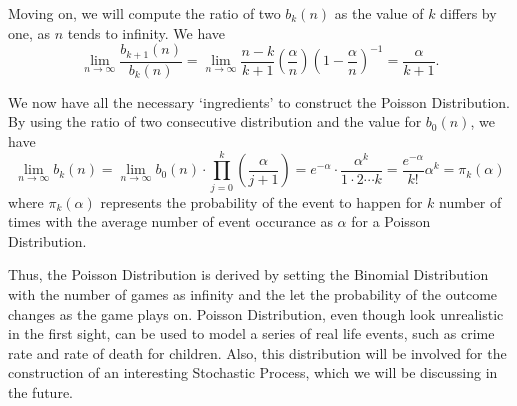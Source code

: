 \documentclass{article}
\theoremstyle{definition}
\begin{document}
\bigskip

\noindent Moving on, we will compute the ratio of two $b_k(n)$ as the value of $k$ differs by one, as $n$ tends to infinity. We have 
\[
\lim_{n \to \infty} \frac{b_{k+1}(n)}{b_{k}(n)} = \lim_{n \to \infty} \frac {n-k}{k+1} (\frac{\alpha}{n})(1-\frac{\alpha}{n})^{-1} = \frac{\alpha}{k+1}.
\]

\bigskip

\noindent We now have all the necessary `ingredients' to construct the Poisson Distribution. By using the ratio of two consecutive distribution and the value for $b_0(n)$, we have
\[
\lim_{n \to \infty} b_k(n) = \lim_{n \to \infty} b_0(n) \cdot \prod_{j=0}^{k}(\frac{\alpha}{j+1})=e^{-\alpha} \cdot \frac{\alpha^k}{1 \cdot 2 \cdots k} = \frac{e^{-\alpha}}{k!}\alpha^k = \pi_k(\alpha)
\]
where $\pi_k(\alpha)$ represents the probability of the event to happen for $k$ number of times with the average number of event occurance as $\alpha$ for a Poisson Distribution.

\bigskip

\noindent Thus, the Poisson Distribution is derived by setting the Binomial Distribution with the number of games as infinity and the let the probability of the outcome changes as the game plays on. Poisson Distribution, even though look unrealistic in the first sight, can be used to model a series of real life events, such as crime rate and rate of death for children. Also, this distribution will be involved for the construction of an interesting Stochastic Process, which we will be discussing in the future.
\end{document}
